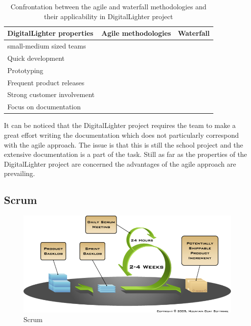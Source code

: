 \begin{table}[htb]
	\begin{center}
	\caption{Confrontation between the agile and waterfall methodologies and their applicability in DigitalLighter project}
	\label{tab:agile_vs_waterfall}
	\def\arraystretch{1.3}
		\begin{tabularx}{0.9\textwidth}{ X c c }
		\toprule[0.5mm]
		\textbf{DigitalLighter properties} & \textbf{Agile methodologies} & \textbf{Waterfall} \\
		\midrule[0.5mm]
		small-medium sized teams 						& \tick  & \tick 	\\
		Quick development				 				& \tick  & \cross 	\\
		Prototyping										& \tick  & \cross 	\\
		Frequent product releases 						& \tick  & \cross 	\\
		Strong customer involvement 					& \tick  & \cross 	\\
		Focus on documentation 							& \cross & \tick  	\\
		\bottomrule[0.5mm]
		\end{tabularx}
	\end{center}
\end{table}

It can be noticed that the DigitalLighter project requires the team to make a great effort writing the documentation which does not particularly correspond with the agile approach. The issue is that this is still the school project and the extensive documentation is a part of the task. Still as far as the properties of the DigitalLighter project are concerned the advantages of the agile approach are prevailing.

\subsection{Scrum} \label{txt:scrum}

\begin{figure}[hbt]
\centering
\includegraphics[width=\textwidth]{preliminaryStudies/scrum.png}
\caption{Scrum}
\label{fig:scrum}
\end{figure}


